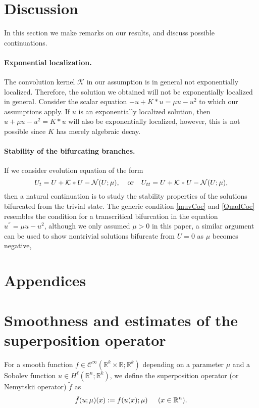 \documentclass[letterpaper,11pt]{article}
\newcommand{\R}{\mathbb{R}}
\newcommand{\Nl}{\mathcal{N}}
\newcommand{\K}{\mathcal{K}}
\numberwithin{equation}{section}
\theoremstyle{plain}
\theoremstyle{remark}
\begin{document}
\section{Discussion}
In this section we make remarks on our results, and discuss possible continuations.
\paragraph{Exponential localization.}
The convolution kernel $\K$ in our assumption is in general not exponentially localized. Therefore, the solution we obtained will not be exponentially localized in general. Consider the scalar equation $-u+K\ast u=\mu u -u^2$ to which our assumptions apply. If $u$ is an exponentially localized solution, then $u+\mu u-u^2 = K\ast u$ will also be exponentially localized, however, this is not possible since $K$ has merely algebraic decay.




\paragraph{Stability of the bifurcating branches.}
If we consider evolution equation of the form \[U_t = U+\K\ast U-\Nl(U;\mu), \hspace{0.1in}\text{ or }\hspace{0.1in} U_{tt} =U+\K\ast U-\Nl(U;\mu),\] then a natural continuation is to study the stability properties of the solutions bifurcated from the trivial state. The generic condition \eqref{muvCoe} and \eqref{QuadCoe} resembles the condition for a transcritical bifurcation in the equation $u^{''}=\mu u-u^2$, although we only assumed $\mu>0$ in this paper, a similar argument can be used to show nontrivial solutions bifurcate from $U=0$ as $\mu$ becomes negative, 

\appendix
{}
\section*{Appendices}
\section{Smoothness and estimates of the superposition operator}
For a smooth function $f \in \mathscr{C}^\infty(\R^k\times \R;\R^k)$ depending on a parameter $\mu$ and a Sobolev function $u  \in H^\ell(\R^n;\R^k)$, we define the superposition operator (or Nemytskii operator) $\tilde{f}$ as 
\[
\tilde{f}(u;\mu) (x) := f(u(x);\mu) \hspace{0.2in}(x \in \R^n).
\]
\end{document}
